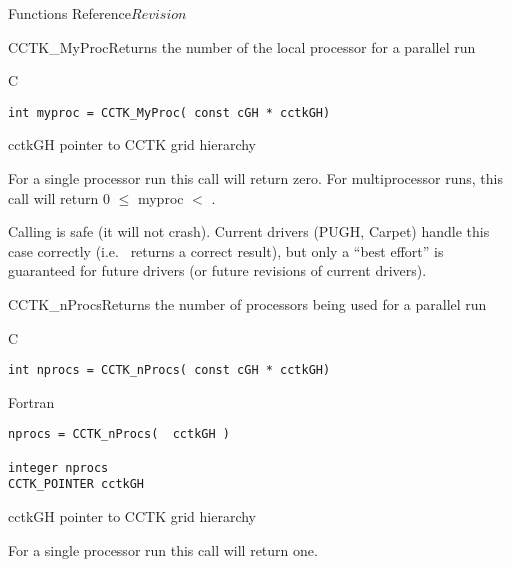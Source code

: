 \begin{cactuspart}{ Functions Reference}{}{$Revision$}
\begin{FunctionDescription}{CCTK\_MyProc}{Returns the number of the local processor for a parallel run}
\label{CCTK-MyProc}
\begin{SynopsisSection}
\begin{Synopsis}{C}
\begin{verbatim}int myproc = CCTK_MyProc( const cGH * cctkGH)\end{verbatim}
\end{Synopsis}
\end{SynopsisSection}
\begin{ParameterSection}
\begin{Parameter}{cctkGH}
pointer to CCTK grid hierarchy
\end{Parameter}
\end{ParameterSection}
\begin{Discussion}
For a single processor run this call will return zero. For multiprocessor
runs, this call will return 0 $\leq$ myproc $<$ .

Calling  is safe (it will not crash).
Current drivers (PUGH, Carpet) handle this case correctly
(i.e.\  returns a correct result), but only
a ``best effort'' is guaranteed for future drivers (or future revisions
of current drivers).
\end{Discussion}
\end{FunctionDescription}






\begin{FunctionDescription}{CCTK\_nProcs}{Returns the number of processors being used for a parallel run}
\label{CCTK-nProcs}
\begin{SynopsisSection}
\begin{Synopsis}{C}
\begin{verbatim}int nprocs = CCTK_nProcs( const cGH * cctkGH)\end{verbatim}
\end{Synopsis}
\begin{Synopsis}{Fortran}
\begin{verbatim}nprocs = CCTK_nProcs(  cctkGH )

integer nprocs
CCTK_POINTER cctkGH\end{verbatim}
\end{Synopsis}
\end{SynopsisSection}
\begin{ParameterSection}
\begin{Parameter}{cctkGH}
pointer to CCTK grid hierarchy
\end{Parameter}
\end{ParameterSection}
\begin{Discussion}
For a single processor run this call will return one.


\end{Discussion}
\end{FunctionDescription}
\end{cactuspart}
